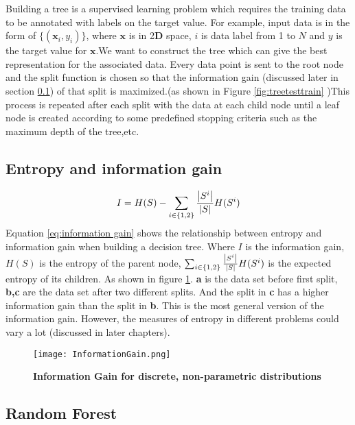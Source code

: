 Building a tree is a supervised learning problem which requires the training data to be annotated with labels on the target value. For example, input data is in the form of $ \{ (\mathbf{x}_{i},y_{i})\}$, where $\mathbf{x}$ is in 2$\mathbf{D}$ space, $i$ is data label from 1 to $N$ and $y$ is the target value for $\mathbf{x}$.We want to construct the tree which can give the best representation for the associated data. Every data point is sent to the root node and the split function is chosen so that the information gain (discussed later in section \ref{subsec:EIG}) of that split is maximized.(as shown in Figure \ref{fig:treetesttrain} )This process is repeated after each split with the data at each child node until a leaf node is created according to some predefined stopping criteria such as the maximum depth of the tree,etc. \cite{DRFHP}

\subsection{Entropy and information gain}
\label{subsec:EIG}

\begin{equation}
\label{eq:information gain}
	I=H(S) - \sum_{i \in \{1,2\}} \frac{\left\vert S^{i}\right\vert}{\left\vert S\right\vert}H(S^{i})
\end{equation}
Equation \eqref{eq:information gain} shows the relationship between entropy and information gain when building a decision tree. Where $\mathit{I}$ is the information gain, $\mathit{H(S)}$ is the entropy of the parent node, $\sum_{i \in \{1,2\}} \frac{\left\vert S^{i}\right\vert}{\left\vert S\right\vert}H(S^{i})$ is the expected entropy of its children. As shown in figure \ref{fig:IG}. \textbf{a} is the data set before first split, \textbf{b,c} are the data set after two different splits. And the split in \textbf{c} has a higher information gain than the split in \textbf{b}. This is the most general version of the information gain. However, the measures of entropy  in different problems could vary a lot (discussed in later chapters).

\begin{figure}
	\centering
	\texttt{[image: InformationGain.png]}
	\caption[Information Gain for discrete, non-parametric distributions]{\label{fig:IG}}  \textbf{Information Gain for discrete, non-parametric distributions} \cite{DFMS}
\end{figure}

\subsection{Random Forest}
\label{subsec:RF}

